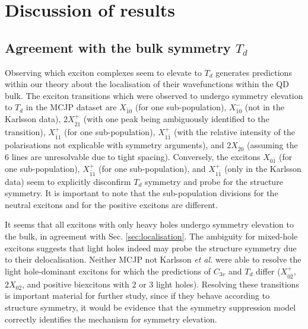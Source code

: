 \section{Discussion of results}


\subsection{Agreement with the bulk symmetry $T_d$}
Observing which exciton complexes seem to elevate to $T_d$ generates predictions within our theory about the localisation of their wavefunctions within the QD bulk. The exciton transitions which were observed to undergo symmetry elevation to $T_d$ in the MCJP dataset are $X_{\bar{1}0}$ (for one sub-population), $X^-_{\bar{1}0}$ (not in the Karlsson data), $2X^+_{\bar{2}1}$ (with one peak being ambiguously identified to the transition), $X^+_{\bar{1}1}$ (for one sub-population),  $X^+_{1\bar{1}}$ (with the relative intensity of the polarisations not explicable with symmetry arguments), and $2X_{\bar{2}0}$ (assuming the $6$ lines are unresolvable due to tight spacing). Conversely, the excitons $X_{0\bar{1}}$ (for one sub-population), $X^+_{\bar{1}1}$ (for one sub-population), and $X^+_{1\bar{1}}$ (only in the Karlsson data) seem to explicitly disconfirm $T_d$ symmetry and probe for the structure symmetry. It is important to note that the sub-population divisions for the neutral excitons and for the positive excitons are different.

It seems that all excitons with only heavy holes undergo symmetry elevation to the bulk, in agreement with Sec. \ref{sec:localisation}. The ambiguity for mixed-hole excitons suggests that light holes indeed may probe the structure symmetry due to their delocalisation. Neither MCJP not Karlsson \textit{et al.} were able to resolve the light hole-dominant excitons for which the predictions of $C_{3v}$ and $T_d$ differ ($X^+_{0\bar{2}}$, $2X_{0\bar{2}}$, and positive biexcitons with $2$ or $3$ light holes). Resolving these transitions is important material for further study, since if they behave according to structure symmetry, it would be evidence that the symmetry suppression   model correctly identifies the mechanism for symmetry elevation.

